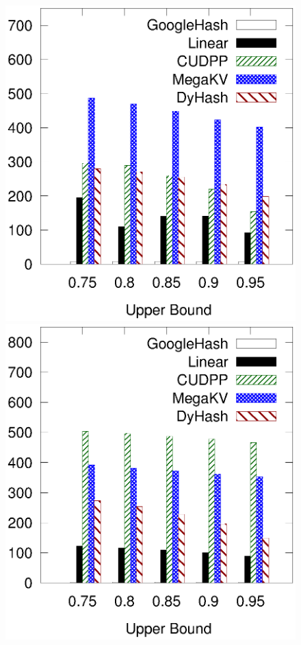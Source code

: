 \begin{figure}[t!]
\begin{minipage}{0.19\linewidth}
		\centerline{\dsreddit}
	\end{minipage}
	\hfill
	\begin{minipage}{0.19\linewidth}\centering
		\includegraphics[width=\linewidth]{pic/static-upper/upper_insert_tpch.eps}
		\centerline{\dstpch}
	\end{minipage}
	\hfill
	\begin{minipage}{0.19\linewidth}\centering
		\includegraphics[width=\linewidth]{pic/static-upper/upper_insert_ali.eps}

\end{minipage}
\end{figure}
